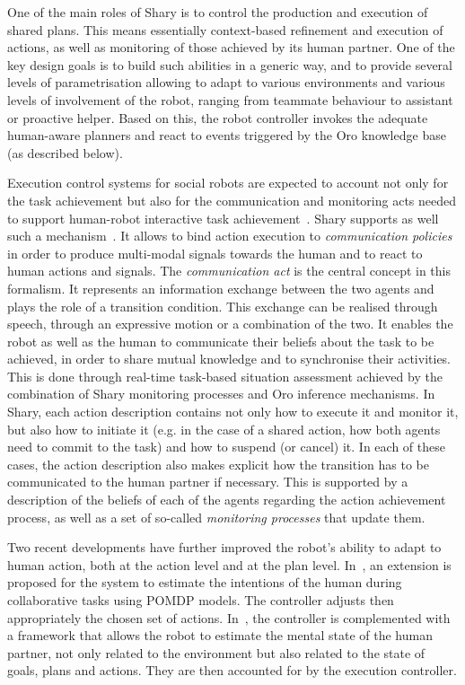 \documentclass[preprint,3p,times]{elsarticle}
\newcommand{\eg}{e.g.\xspace}
\begin{document}
One of the main roles of {\sc Shary} is to control the production and execution
of shared plans. This means essentially context-based refinement and execution
of actions, as well as monitoring of those achieved by its human
partner. One of the key design goals is to build such abilities in a generic
way, and to provide several levels of parametrisation allowing to adapt to
various environments and various levels of involvement of the robot, ranging
from teammate behaviour to assistant or proactive helper. Based on this,
the robot controller invokes the adequate human-aware planners and react to
events triggered by the {\sc Oro} knowledge base (as described below).

Execution control systems for social robots are expected 
to account not only for the task achievement but also for the communication
and monitoring acts needed to support human-robot interactive task
achievement~\cite{Rich1997,Sidner2005,sebanz2006joint}. {\sc Shary} supports as
well
such a mechanism~\cite{Clodic2007smc}. It allows
to bind action execution to \emph{communication policies} in order to produce
multi-modal signals towards the human and to react to human actions and signals. The
\emph{communication act} is the central concept in this formalism. It
represents an information exchange between the two agents and plays the role of
a transition condition. This exchange can be realised through speech, through an
expressive motion or a combination of the two. It enables the robot as well as the human to
communicate their beliefs about the task to be achieved, in order to share
mutual knowledge and to synchronise their activities.  This is done through
real-time task-based situation assessment achieved by the combination of {\sc
Shary} monitoring processes and {\sc Oro} inference mechanisms. In {\sc Shary},
each action description contains not only how to execute it and monitor it,
but also how to initiate it (\eg in the case of a shared action, how
both agents need to commit to the task) and how to suspend (or cancel) it. In
each of these cases, the action description also makes explicit how the
transition has to be communicated to the human partner if necessary. This is
supported by a description of the beliefs of each of the agents
regarding the action achievement process, as well as a set of so-called
\emph{monitoring processes} that update them.

Two recent developments have further improved the robot's ability to adapt to
human action, both at the action level and at the plan level.
In~\cite{fiore2014}, an extension is proposed for the
system to estimate the intentions of the human during collaborative tasks using
POMDP models. The controller adjusts then appropriately the chosen set of actions.
In~\cite{devin2016implemented}, the controller is complemented with a framework
that allows the robot to estimate the mental state of the human partner, not
only related to the environment but also related to the state of goals, plans
and actions. They are then accounted for by the execution controller.
\end{document}

